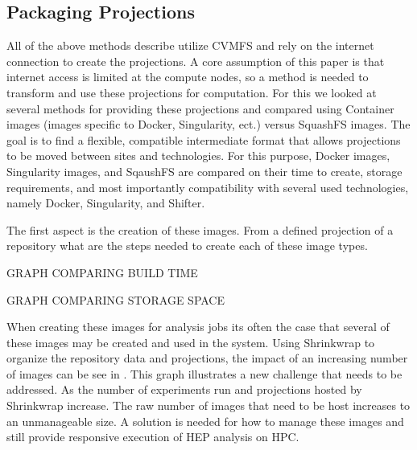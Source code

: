 \documentclass[sigconf]{acmart}
\begin{document}
\subsection{Packaging Projections}

All of the above methods describe utilize CVMFS
and rely on the internet connection to create
the projections.
A core assumption of this paper is that internet
access is limited at the compute nodes, so a method
is needed to transform and use these projections
for computation.
For this we looked at several methods for providing
these projections and compared using 
Container images (images specific to Docker, Singularity, ect.)
versus SquashFS images.
The goal is to find a flexible, compatible intermediate
format that allows projections to be moved between sites
and technologies.
For this purpose, Docker images, Singularity images, and 
SqaushFS are compared on their time to create,
storage requirements, and most importantly compatibility
with several used technologies, namely 
Docker, Singularity, and Shifter.

The first aspect is the creation of these images.
From a defined projection of a repository
what are the steps needed to create each of these image types.

GRAPH COMPARING BUILD TIME

GRAPH COMPARING STORAGE SPACE


When creating these images for analysis jobs its often the case that several
of these images may be created and used in the system.
Using Shrinkwrap to organize the repository data and projections,
the impact of an increasing number of images can be see in 
.
This graph illustrates a new challenge that needs to be addressed.
As the number of experiments run and projections hosted by Shrinkwrap
increase. 
The raw number of images that need to be host increases to an unmanageable
size.
A solution is needed for how to manage these images and still
provide responsive execution of HEP analysis on HPC.
\end{document}
